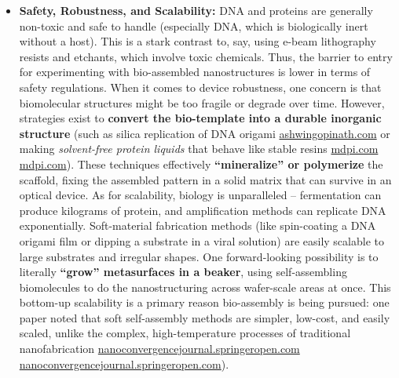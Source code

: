 \documentclass[11pt,a4paper]{article}
\begin{document}
\begin{itemize}
  \item \textbf{Safety, Robustness, and Scalability:} DNA and proteins are generally non-toxic and safe to handle (especially DNA, which is biologically inert without a host). This is a stark contrast to, say, using e-beam lithography resists and etchants, which involve toxic chemicals. Thus, the barrier to entry for experimenting with bio-assembled nanostructures is lower in terms of safety regulations. When it comes to device robustness, one concern is that biomolecular structures might be too fragile or degrade over time. However, strategies exist to \textbf{convert the bio-template into a durable inorganic structure} (such as silica replication of DNA origami \href{https://ashwingopinath.com/large-area-nanopatterning#:~:text=features function well as a,also be used to template}{ashwingopinath.com} or making \emph{solvent-free protein liquids} that behave like stable resins \href{https://www.mdpi.com/2079-6374/12/11/962#:~:text=3}{mdpi.com} \href{https://www.mdpi.com/2079-6374/12/11/962#:~:text=of proteins ,component%2C stoichiometric conjugate by}{mdpi.com}). These techniques effectively \textbf{``mineralize'' or polymerize} the scaffold, fixing the assembled pattern in a solid matrix that can survive in an optical device. As for scalability, biology is unparalleled -- fermentation can produce kilograms of protein, and amplification methods can replicate DNA exponentially. Soft-material fabrication methods (like spin-coating a DNA origami film or dipping a substrate in a viral solution) are easily scalable to large substrates and irregular shapes. One forward-looking possibility is to literally \textbf{``grow'' metasurfaces in a beaker}, using self-assembling biomolecules to do the nanostructuring across wafer-scale areas at once. This bottom-up scalability is a primary reason bio-assembly is being pursued: one paper noted that soft self-assembly methods are simpler, low-cost, and easily scaled, unlike the complex, high-temperature processes of traditional nanofabrication \href{https://nanoconvergencejournal.springeropen.com/articles/10.1186/s40580-020-00226-7#:~:text=materials include polymers%2C colloidal dispersions%2C,offer great opportunities to construct}{nanoconvergencejournal.springeropen.com} \href{https://nanoconvergencejournal.springeropen.com/articles/10.1186/s40580-020-00226-7#:~:text=The concept of soft materials,Soft matters have also been}{nanoconvergencejournal.springeropen.com}).
\end{itemize}
\end{document}
